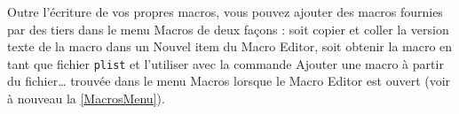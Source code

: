 \documentclass[11pt,french]{article}
\newcommand{\TS}{\textsf{\TeX Shop}}
\newcommand{\mnu}[1]{\textsf{#1}}
\newcommand{\To}{\,\(\to\)\,}
\begin{document}
Outre l'écriture de vos propres macros, vous pouvez ajouter des macros fournies par des tiers dans le menu \mnu{Macros} de deux façons : soit copier et coller la version texte de la macro dans un \mnu{Nouvel item} du \mnu{Macro Editor}, soit obtenir la macro en tant que fichier \texttt{plist} et l'utiliser avec la commande \mnu{Ajouter une macro à partir du fichier…} trouvée dans le menu \mnu{Macros} lorsque le \mnu{Macro Editor} est ouvert (voir à nouveau la \cref{MacrosMenu}).


%
%

\begin{figure}
\begin{floatrow}
%
\end{floatrow}
\end{figure}
\end{document}

